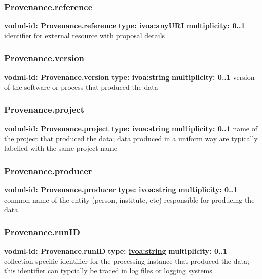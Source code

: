     \subsubsection{Provenance.reference}
      \textbf{vodml-id: Provenance.reference} \newline
      \textbf{type: \hyperref[sect:ivoa]{ivoa:anyURI}} \newline
      \textbf{multiplicity: 0..1} \newline
      identifier for external resource with proposal details

    \subsubsection{Provenance.version}
      \textbf{vodml-id: Provenance.version} \newline
      \textbf{type: \hyperref[sect:ivoa]{ivoa:string}} \newline
      \textbf{multiplicity: 0..1} \newline
      version of the software or process that produced the data

    \subsubsection{Provenance.project}
      \textbf{vodml-id: Provenance.project} \newline
      \textbf{type: \hyperref[sect:ivoa]{ivoa:string}} \newline
      \textbf{multiplicity: 0..1} \newline
      name of the project that produced the data; data produced in a uniform way are typically labelled with the same project name

    \subsubsection{Provenance.producer}
      \textbf{vodml-id: Provenance.producer} \newline
      \textbf{type: \hyperref[sect:ivoa]{ivoa:string}} \newline
      \textbf{multiplicity: 0..1} \newline
      common name of the entity (person, institute, etc) responsible for producing the data

    \subsubsection{Provenance.runID}
      \textbf{vodml-id: Provenance.runID} \newline
      \textbf{type: \hyperref[sect:ivoa]{ivoa:string}} \newline
      \textbf{multiplicity: 0..1} \newline
      collection-specific identifier for the processing instance that produced the data; this identifier can typcially be traced in log files or logging systems


